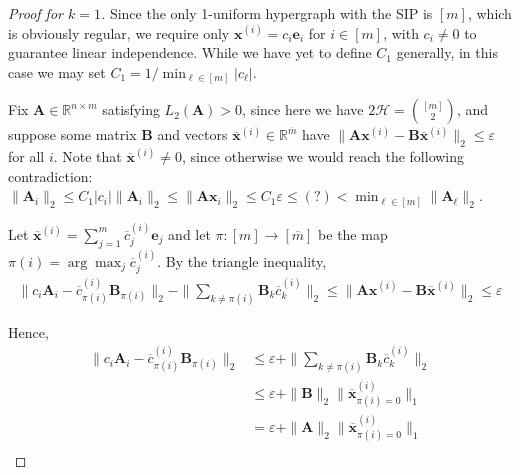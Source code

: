 \documentclass[journal, onecolumn]{IEEEtran}
\begin{document}
\begin{proof}[Proof for $k=1$]
Since the only 1-uniform hypergraph with the SIP is $[m]$, which is obviously regular, we require only $\mathbf{x}^{(i)} = c_i \mathbf{e}_i$ for $i \in [m]$, with $c_i \neq 0$ to guarantee  linear independence. While we have yet to define $C_1$ generally, in this case we may set $C_1 = 1/ \min_{\ell \in [m]} |c_{\ell}|$. %

Fix $\mathbf{A} \in \mathbb{R}^{n \times m}$ satisfying $L_2(\mathbf{A}) > 0$, since here we have $2\mathcal{H} = {[m] \choose 2}$, and suppose some matrix $\mathbf{B}$ and vectors $\mathbf{\overline x}^{(i)} \in \mathbb{R}^{\overline m}$ have  $\|\mathbf{A}\mathbf{x}^{(i)} - \mathbf{B}\mathbf{\overline x}^{(i)}\|_2 \leq \varepsilon$ for all $i$. Note that $\mathbf{\overline x}^{(i)} \neq 0$, since otherwise we would reach the following contradiction: $\|\mathbf{A}_i \|_2 \leq C_1 |c_i| \|\mathbf{A}_i \|_2  \leq \|\mathbf{Ax}_i\|_2 \leq C_1\varepsilon \leq  (?) < \min_{\ell \in [m]} \|\mathbf{A}_\ell\|_2$. %

Let $\mathbf{\overline x}^{(i)} = \sum_{j=1}^m \overline c^{(i)}_j \mathbf{e}_j$ and let $\pi: [m] \to [\overline m]$ be the map $\pi(i) = \arg \max_j \overline c^{(i)}_j$. By the triangle inequality,
\begin{align}\label{1D}
\|c_i\mathbf{A}_i - \overline{c}^{(i)}_{\pi(i)}\mathbf{B}_{\pi(i)}\|_2  -  \|\sum_{k \neq \pi(i)} \mathbf{B}_k \overline c^{(i)}_k \|_2
\leq \|\mathbf{A}\mathbf{x}^{(i)} - \mathbf{B}\mathbf{\overline x}^{(i)}\|_2 
\leq \varepsilon
\end{align} 

Hence, %
\begin{align}\label{1D}
\|c_i\mathbf{A}_i - \overline{c}^{(i)}_{\pi(i)}\mathbf{B}_{\pi(i)}\|_2 
&\leq \varepsilon + \|\sum_{k \neq \pi(i)} \mathbf{B}_k \overline c^{(i)}_k \|_2 \\
&\leq \varepsilon + \|\mathbf{B}\|_2 \| \mathbf{\overline x}^{(i)}_{\pi(i)=0} \|_1 \\
&= \varepsilon + \|\mathbf{A}\|_2 \| \mathbf{\overline x}^{(i)}_{\pi(i)=0} \|_1 \\
\end{align} 


\end{proof}
\end{document}
